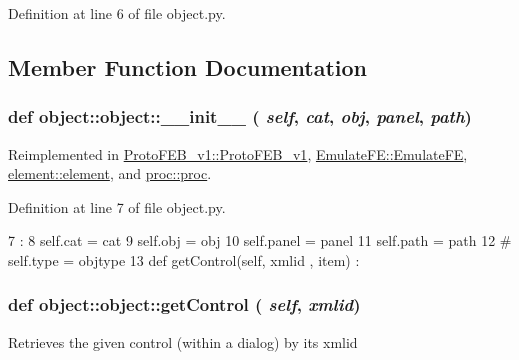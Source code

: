 Definition at line 6 of file object.py.

\subsection{Member Function Documentation}
\hypertarget{classobject_1_1object_a1220f7c88ee9a71fcfd9acb49a2f44d8}{
\subsubsection[{\_\-\_\-init\_\-\_\-}]{\setlength{\rightskip}{0pt plus 5cm}def object::object::\_\-\_\-init\_\-\_\- ( {\em self}, \/   {\em cat}, \/   {\em obj}, \/   {\em panel}, \/   {\em path})}}
\label{classobject_1_1object_a1220f7c88ee9a71fcfd9acb49a2f44d8}


Reimplemented in \hyperlink{classProtoFEB__v1_1_1ProtoFEB__v1_a4fe76cce14ea6f67a0b32d45a92ab577}{ProtoFEB\_\-v1::ProtoFEB\_\-v1}, \hyperlink{classEmulateFE_1_1EmulateFE_a3749dd5f45e93a8550800372a3ee40b6}{EmulateFE::EmulateFE}, \hyperlink{classelement_1_1element_a7c08cd9a50e415b05efacce60b4511d2}{element::element}, and \hyperlink{classproc_1_1proc_a21e9bcad44f0098f74639f245d2d0e4b}{proc::proc}.

Definition at line 7 of file object.py.


\begin{DoxyCode}
7                                              :
8         self.cat   = cat
9         self.obj   = obj
10         self.panel = panel
11         self.path  = path
12 #        self.type  = objtype
13         
    def getControl(self, xmlid , item) :
\end{DoxyCode}
\hypertarget{classobject_1_1object_ac765747a2b581d48eeb94e600c31fc3f}{
\subsubsection[{getControl}]{\setlength{\rightskip}{0pt plus 5cm}def object::object::getControl ( {\em self}, \/   {\em xmlid})}}
\label{classobject_1_1object_ac765747a2b581d48eeb94e600c31fc3f}
\begin{DoxyVerb}Retrieves the given control (within a dialog) by its xmlid\end{DoxyVerb}
 

